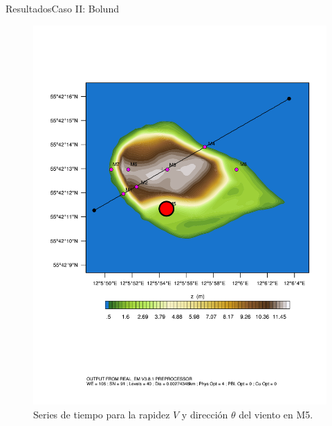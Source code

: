\documentclass[mathserif,10pt]{beamer}
\begin{document}
\begin{frame}{Resultados}{Caso II: Bolund}
\begin{figure}[H]
\begin{minipage}{0.35\linewidth}
		\includegraphics[width=1\linewidth,page=1,trim={3.5cm 9.3cm 0.8cm 3.8cm},clip]{fig/05/ppt/bol_control_point5.pdf}%
	\end{minipage}%
		\vspace{-2mm}\caption{Series de tiempo para la rapidez $V$ y dirección $\theta$ del viento en M5.}
		\label{fig:06_bol_ts_m5}
	\end{figure}
\end{frame}
\end{document}
